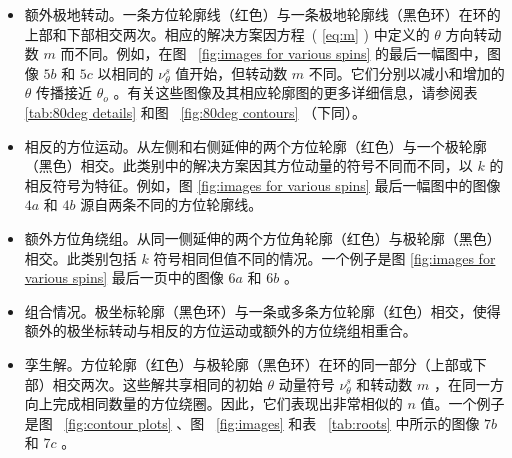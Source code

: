 \documentclass[aps,reprint,superscriptaddress,nofootinbib,floatfix,longbibliography,preprintnumbers]{revtex4-1}
\begin{document}
   \begin{itemize}

    \item   额外极地转动。一条方位轮廓线（红色）与一条极地轮廓线（黑色环）在环的上部和下部相交两次。相应的解决方案因方程~(    \ref{eq:m}    ) 中定义的    $\theta$    方向转动数    $m$    而不同。例如，在图~    \ref{fig:images for various spins}    的最后一幅图中，图像    $5b$    和    $5c$    以相同的    $\nu_{\theta}^s$    值开始，但转动数    $m$    不同。它们分别以减小和增加的    $\theta$    传播接近    $\theta_o$   。有关这些图像及其相应轮廓图的更多详细信息，请参阅表~    \ref{tab:80deg details}    和图~    \ref{fig:80deg contours}   （下同）。   \item   相反的方位运动。从左侧和右侧延伸的两个方位轮廓（红色）与一个极轮廓（黑色）相交。此类别中的解决方案因其方位动量的符号不同而不同，以    $k$    的相反符号为特征。例如，图  {    \ref{fig:images for various spins}      }  最后一幅图中的图像    $4a$    和    $4b$    源自两条不同的方位轮廓线。   \item   额外方位角绕组。从同一侧延伸的两个方位角轮廓（红色）与极轮廓（黑色）相交。此类别包括    $k$    符号相同但值不同的情况。一个例子是图    \ref{fig:images for various spins}    最后一页中的图像    $6a$    和    $6b$   。   \item   组合情况。极坐标轮廓（黑色环）与一条或多条方位轮廓（红色）相交，使得额外的极坐标转动与相反的方位运动或额外的方位绕组相重合。   \item   孪生解。方位轮廓（红色）与极轮廓（黑色环）在环的同一部分（上部或下部）相交两次。这些解共享相同的初始    $\theta$    动量符号    $\nu_{\theta}^s$    和转动数    $m$    ，在同一方向上完成相同数量的方位绕圈。因此，它们表现出非常相似的    $n$    值。一个例子是图~    \ref{fig:contour plots}    、图~    \ref{fig:images}    和表~    \ref{tab:roots}    中所示的图像    $7b$    和    $7c$   。  \end{itemize}     
\end{document}
